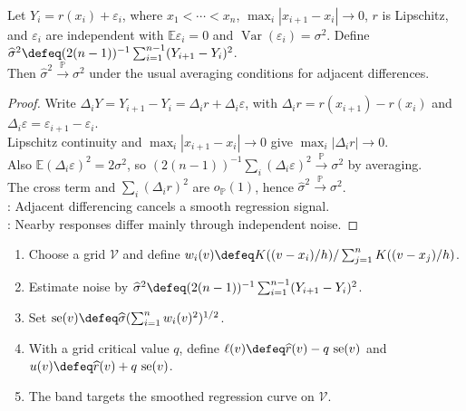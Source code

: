 \begin{proposition} \label{prop:adjacent-difference-error-variance-estimator} \\
Let $Y_i=r(x_i)+\varepsilon_i$, where $x_1<\cdots<x_n$, $\max_i|x_{i+1}-x_i|\to0$, $r$ is Lipschitz, and $\varepsilon_i$ are independent with $\mathbb{E}\varepsilon_i=0$ and $\operatorname{Var}(\varepsilon_i)=\sigma^2$. Define $\widehat\sigma^2\defeq(2(n-1))^{-1}\sum_{i=1}^{n-1}(Y_{i+1}-Y_i)^2$.\\
Then $\widehat\sigma^2\xrightarrow{\mathbb{P}}\sigma^2$ under the usual averaging conditions for adjacent differences.
\begin{proof} Write $\Delta_iY=Y_{i+1}-Y_i=\Delta_ir+\Delta_i\varepsilon$, with $\Delta_ir=r(x_{i+1})-r(x_i)$ and $\Delta_i\varepsilon=\varepsilon_{i+1}-\varepsilon_i$.\\
Lipschitz continuity and $\max_i|x_{i+1}-x_i|\to0$ give $\max_i|\Delta_ir|\to0$.\\
Also $\mathbb{E}(\Delta_i\varepsilon)^2=2\sigma^2$, so $(2(n-1))^{-1}\sum_i(\Delta_i\varepsilon)^2\xrightarrow{\mathbb{P}}\sigma^2$ by averaging.\\
The cross term and $\sum_i(\Delta_ir)^2$ are $o_{\mathbb{P}}(1)$, hence $\widehat\sigma^2\xrightarrow{\mathbb{P}}\sigma^2$.\\
: Adjacent differencing cancels a smooth regression signal.\\
: Nearby responses differ mainly through independent noise.
\end{proof}
\end{proposition}

\begin{method} \label{meth:kernel-regression-confidence-band} 
\begin{enumerate}[label=(\roman*)]
\setlength{\itemsep}{0pt}
\item Choose a grid $\mathcal{V}$ and define $w_i(v)\defeq K((v-x_i)/h)/\sum_{j=1}^{n}K((v-x_j)/h)$.
\item Estimate noise by $\widehat\sigma^2\defeq(2(n-1))^{-1}\sum_{i=1}^{n-1}(Y_{i+1}-Y_i)^2$.
\item Set $\operatorname{se}(v)\defeq\widehat\sigma(\sum_{i=1}^{n}w_i(v)^2)^{1/2}$.
\item With a grid critical value $q$, define $\ell(v)\defeq\widehat r(v)-q\,\operatorname{se}(v)$ and $u(v)\defeq\widehat r(v)+q\,\operatorname{se}(v)$.
\item The band targets the smoothed regression curve on $\mathcal{V}$.
\end{enumerate}
\end{method}

